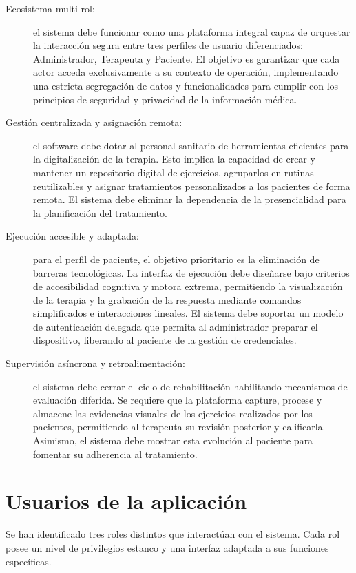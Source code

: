 \begin{description}
    \item[Ecosistema multi-rol:] el sistema debe funcionar como una plataforma integral capaz de orquestar la interacción segura entre tres perfiles de usuario diferenciados: Administrador, Terapeuta y Paciente. El objetivo es garantizar que cada actor acceda exclusivamente a su contexto de operación, implementando una estricta segregación de datos y funcionalidades para cumplir con los principios de seguridad y privacidad de la información médica.
    
    \item[Gestión centralizada y asignación remota:] el software debe dotar al personal sanitario de herramientas eficientes para la digitalización de la terapia. Esto implica la capacidad de crear y mantener un repositorio digital de ejercicios, agruparlos en rutinas reutilizables y asignar tratamientos personalizados a los pacientes de forma remota. El sistema debe eliminar la dependencia de la presencialidad para la planificación del tratamiento.
    
    \item[Ejecución accesible y adaptada:] para el perfil de paciente, el objetivo prioritario es la eliminación de barreras tecnológicas. La interfaz de ejecución debe diseñarse bajo criterios de accesibilidad cognitiva y motora extrema, permitiendo la visualización de la terapia y la grabación de la respuesta mediante comandos simplificados e interacciones lineales. El sistema debe soportar un modelo de autenticación delegada que permita al administrador preparar el dispositivo, liberando al paciente de la gestión de credenciales.
    
    \item[Supervisión asíncrona y retroalimentación:] el sistema debe cerrar el ciclo de rehabilitación habilitando mecanismos de evaluación diferida. Se requiere que la plataforma capture, procese y almacene las evidencias visuales de los ejercicios realizados por los pacientes, permitiendo al terapeuta su revisión posterior y calificarla. Asimismo, el sistema debe mostrar esta evolución al paciente para fomentar su adherencia al tratamiento.
\end{description}

\section{Usuarios de la aplicación}
Se han identificado tres roles distintos que interactúan con el sistema. Cada rol posee un nivel de privilegios estanco y una interfaz adaptada a sus funciones específicas.

